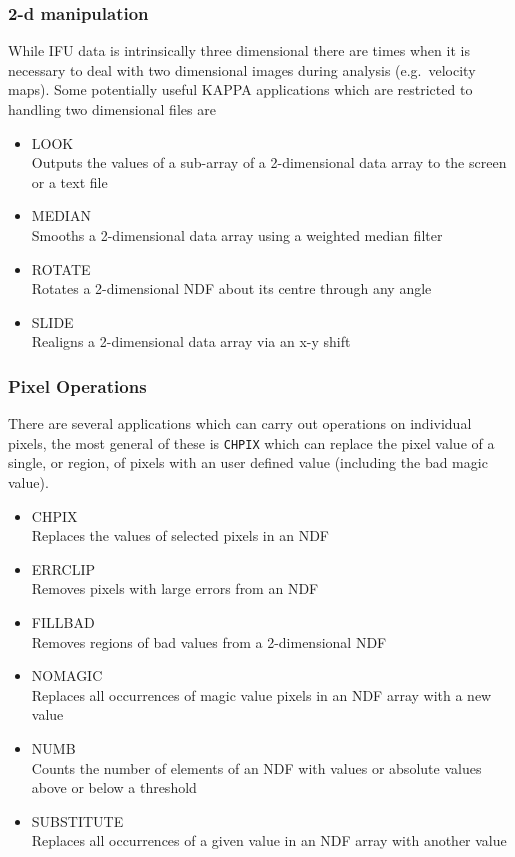 \documentclass[twoside,11pt]{article}
\newcommand{\xref}[3]{#1}
\begin{document}
\subsubsection{2-d manipulation}

While IFU data is intrinsically three dimensional there are times when it is necessary to deal with two dimensional images during analysis (e.g.\ velocity maps). Some potentially useful KAPPA applications which are restricted to handling two dimensional files are

\begin{itemize}
\item{\xref{LOOK}{sun95}{LOOK}}\\
Outputs the values of a sub-array of a 2-dimensional data array to the screen or a text file
\item{\xref{MEDIAN}{sun95}{MEDIAN}}\\ 
Smooths a 2-dimensional data array using a weighted median filter 
\item{\xref{ROTATE}{sun95}{ROTATE}}\\
Rotates a 2-dimensional NDF about its centre through any angle 
\item{\xref{SLIDE}{sun95}{SLIDE}}\\
Realigns a 2-dimensional data array via an x-y shift 
\end{itemize}
 
\subsubsection{Pixel Operations}

There are several applications which can carry out operations on individual pixels, the most general of these is \xref{{\tt CHPIX}}{sun95}{CHPIX} which can replace the pixel value of a single, or region, of pixels with an user defined value (including the bad \xref{magic value}{sun95}{se_masking}).

\begin{itemize}
\item{\xref{CHPIX}{sun95}{CHPIX}}\\ 
Replaces the values of selected pixels in an NDF 
\item{\xref{ERRCLIP}{sun95}{ERRCLIP}}\\ 
Removes pixels with large errors from an NDF 
\item{\xref{FILLBAD}{sun95}{FILLBAD}}\\ 
Removes regions of bad values from a 2-dimensional NDF 
\item{\xref{NOMAGIC}{sun95}{NOMAGIC}}\\ 
Replaces all occurrences of \xref{magic value}{sun95}{se_masking} pixels in an NDF array with a new value 
\item{\xref{NUMB}{sun95}{NUMB}}\\ 
Counts the number of elements of an NDF with values or absolute values above or below a threshold 
\item{\xref{SUBSTITUTE}{sun95}{SUBSTITUTE}}\\
Replaces all occurrences of a given value in an NDF array with another value 
\end{itemize}
\end{document}
